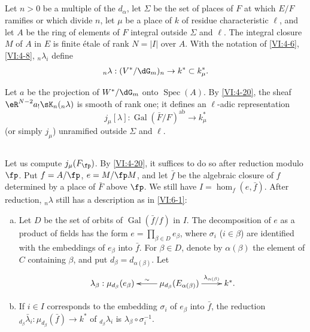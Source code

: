 \documentclass[oneside]{book}
\DeclareMathOperator{\gal}{Gal}
\DeclareMathOperator{\spec}{Spec}
\newcounter{char}
\theoremstyle{sga-source}
\theoremstyle{sga-source-dash}
\theoremstyle{sga-source-dotdash}
\theoremstyle{sga-source-number-note-dash}
\theoremstyle{sga-source-note-number-dotdash}
\theoremstyle{sga-source-example-dotdash}
\theoremstyle{sga-source-inline-number}
\theoremstyle{sga-source-bare-number}
\theoremstyle{sga-source}
\newcommand{\PrintPage}[1]{}\newcommand{\MathPage}[1]{}\newcommand{\PrintCite}[2]{#1}\newcommand{\var}[3]{#2}
\begin{document}
\subsection{}\label{VI:6-2}

Let $n>0$ be a multiple of the $d_\alpha$, let $\Sigma$ be the set of places of $F$ 
at which $E/F$ ramifies or which divide $n$, let $\mu$ be a place of $k$ of 
residue characteristic $\ell$, and let $A$ be the ring of elements of $F$ 
integral outside $\Sigma$ and $\ell$. The integral closure $M$ of $A$ in $E$ 
is finite étale of rank $N=|I|$ over $A$. With the notation of \ref{VI:4-6}, 
\ref{VI:4-8}, $_n \lambda_i$ define 
\[
  _n\lambda:(V^\ast/\dG_m)_n \to k^\ast \subset k_\mu^\ast \text{.} 
\]

Let $a$ be the projection of $W^\ast/\dG_m$ onto $\spec(A)$. By 
\ref{VI:4-20}, the sheaf $\eR^{N-2} a_! \sK_n(_n \lambda)$ is smooth of rank 
one; it defines an $\ell$-adic representation 
\[
  j_\mu[\lambda]:\gal(\bar F/F)^\text{ab} \to k_\mu^\ast 
\]
  (or simply $j_\mu$) unramified outside $\Sigma$ and $\ell$. 





\subsection{}\label{VI:6-3}

Let us compute $j_\mu(F_\fp)$. By \ref{VI:4-20}, it suffices to do so 
after reduction modulo $\fp$. Put $f=A/\fp$, $e=M/\fp  M$, and let 
$\bar f$ be the algebraic closure of $f$ determined by a place of $\bar F$ 
above $\fp$. We still have $I=\hom_f(e,\bar f)$. After reduction, 
$_n\lambda$ still has a description as in \ref{VI:6-1}: 
\begin{enumerate}[a)]
  \item Let $D$ be the set of orbits of $\gal(\bar f/f)$ in $I$. The 
    decomposition of $e$ as a product of fields has the form 
    $e=\prod_{\beta\in D} e_\beta$, where $\sigma_i$ ($i\in \beta$) 
    are identified with the \var{embeddings of $e_\beta$ into $f$}{embeddings of $e_\beta$ into $\bar f$}{S45-SOL-0898}. For $\beta\in D$, 
    denote by $\alpha(\beta)$ the element of $C$ \PrintPage{215}
containing $\beta$, and put 
    $d_\beta=d_{\alpha(\beta)}$. Let 
    \[\xymatrix{
      \lambda_\beta : \mu_{d_\beta}(e_\beta) 
        & \ar[l]_-\sim \mu_{d_\beta}(E_{\alpha(\beta)}) \ar[r]^-{\var{\lambda_{d(\beta)}}{\lambda_{\alpha(\beta)}}{S45-SOL-0899}} 
        & k^\ast \text{.} 
    }\]
  \item If $i\in I$ corresponds to the embedding $\sigma_i$ of $e_\beta$ into 
    $\bar f$, the reduction 
    $_{d_\beta} \bar\lambda_i:\mu_{d_\beta}(\bar f) \to k^\ast$ 
    of $_{d_\beta} \lambda_i$ is 
    $\lambda_\beta \circ \sigma_i^{-1}$. 
\end{enumerate}
\end{document}
